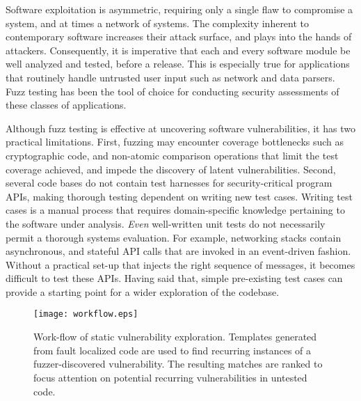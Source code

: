 Software exploitation is asymmetric, requiring only a single flaw to compromise a system, and at times a network of systems.
The complexity inherent to contemporary software increases their attack surface, and plays into the hands of attackers.
Consequently, it is imperative that each and every software module be well analyzed and tested, before a release.
This is especially true for applications that routinely handle untrusted user input such as network and data parsers.
Fuzz testing has been the tool of choice for conducting security assessments of these classes of applications.

Although fuzz testing is effective at uncovering software vulnerabilities, it has two practical limitations.
First, fuzzing may encounter coverage bottlenecks such as cryptographic code, and non-atomic comparison operations that limit the test coverage achieved, and impede the discovery of latent vulnerabilities.
Second, several code bases do not contain test harnesses for security-critical program APIs, making thorough testing dependent on writing new test cases.
Writing test cases is a manual process that requires domain-specific knowledge pertaining to the software under analysis.
{\it Even} well-written unit tests do not necessarily permit a thorough systems evaluation.
For example, networking stacks contain asynchronous, and stateful API calls that are invoked in an event-driven fashion.
Without a practical set-up that injects the right sequence of messages, it becomes difficult to test these APIs.
Having said that, simple pre-existing test cases can provide a starting point for a wider exploration of the codebase.

\begin{figure*}[t]
  \centering
  \texttt{[image: workflow.eps]}
  \caption{Work-flow of static vulnerability exploration. Templates generated from fault localized code are used to find recurring instances of a fuzzer-discovered vulnerability. The resulting matches are ranked to focus attention on potential recurring vulnerabilities in untested code.}
  \label{fig:workflow}
\end{figure*}

